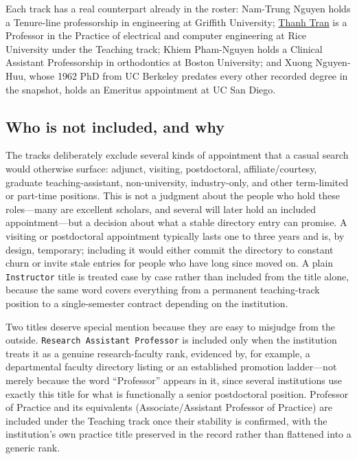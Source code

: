 \documentclass[11pt]{article}
\newcommand{\code}[1]{\texttt{\small #1}}
\newcommand{\vplink}[2]{\href{https://vietprofs.roars.dev/?q=#1}{#2}}
\begin{document}
Each track has a real counterpart already in the roster: Nam-Trung Nguyen holds a Tenure-line professorship in engineering at Griffith University; \vplink{Thanh+Tran}{Thanh Tran} is a Professor in the Practice of electrical and computer engineering at Rice University under the Teaching track; Khiem Pham-Nguyen holds a Clinical Assistant Professorship in orthodontics at Boston University; and Xuong Nguyen-Huu, whose 1962 PhD from UC Berkeley predates every other recorded degree in the snapshot, holds an Emeritus appointment at UC San Diego.

\subsection{Who is not included, and why}
The tracks deliberately exclude several kinds of appointment that a casual search would otherwise surface: adjunct, visiting, postdoctoral, affiliate/courtesy, graduate teaching-assistant, non-university, industry-only, and other term-limited or part-time positions.
This is not a judgment about the people who hold these roles---many are excellent scholars, and several will later hold an included appointment---but a decision about what a stable directory entry can promise.
A visiting or postdoctoral appointment typically lasts one to three years and is, by design, temporary; including it would either commit the directory to constant churn or invite stale entries for people who have long since moved on.
A plain \code{Instructor} title is treated case by case rather than included from the title alone, because the same word covers everything from a permanent teaching-track position to a single-semester contract depending on the institution.

Two titles deserve special mention because they are easy to misjudge from the outside.
\code{Research Assistant Professor} is included only when the institution treats it as a genuine research-faculty rank, evidenced by, for example, a departmental faculty directory listing or an established promotion ladder---not merely because the word ``Professor'' appears in it, since several institutions use exactly this title for what is functionally a senior postdoctoral position.
Professor of Practice and its equivalents (Associate/Assistant Professor of Practice) are included under the Teaching track once their stability is confirmed, with the institution's own practice title preserved in the record rather than flattened into a generic rank.
\end{document}
